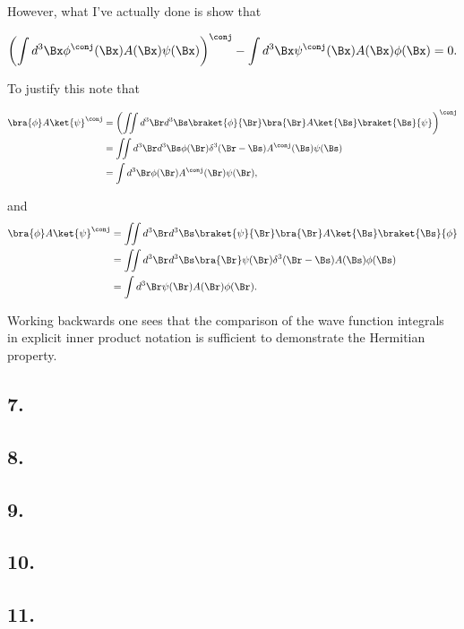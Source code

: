 However, what I've actually done is show that 

\begin{align*}
\left( \int d^3 \Bx \phi^\conj (\Bx) A(\Bx) \psi(\Bx) \right)^\conj - \int d^3 \Bx \psi^\conj (\Bx) A(\Bx) \phi(\Bx) = 0.
\end{align*}

To justify this note that 

\begin{align*}
\bra{\phi} A \ket{\psi}^\conj 
&=
\left( \iint d^3 \Br d^3 \Bs \braket{\phi}{\Br} \bra{\Br} A \ket{\Bs} \braket{\Bs}{\psi} \right)^\conj \\
&=
\iint d^3 \Br d^3 \Bs \phi(\Br) \delta^3(\Br - \Bs) A^\conj(\Bs) \psi(\Bs) \\
&=
\int d^3 \Br \phi(\Br) A^\conj(\Br) \psi(\Br),
\end{align*}

and
\begin{align*}
\bra{\phi} A \ket{\psi}^\conj 
&=
\iint d^3 \Br d^3 \Bs \braket{\psi}{\Br} \bra{\Br} A \ket{\Bs} \braket{\Bs}{\phi} \\
&=
\iint d^3 \Br d^3 \Bs \bra{\Br} \psi(\Br) \delta^3(\Br - \Bs) A(\Bs) \phi(\Bs) \\
&=
\int d^3 \Br \psi(\Br) A(\Br) \phi(\Br).
\end{align*}

Working backwards one sees that the comparison of the wave function integrals in explicit inner product notation is sufficient to demonstrate the Hermitian property.

\subsection{7.}
\subsection{8.}
\subsection{9.}
\subsection{10.}
\subsection{11.}

\EndArticle
